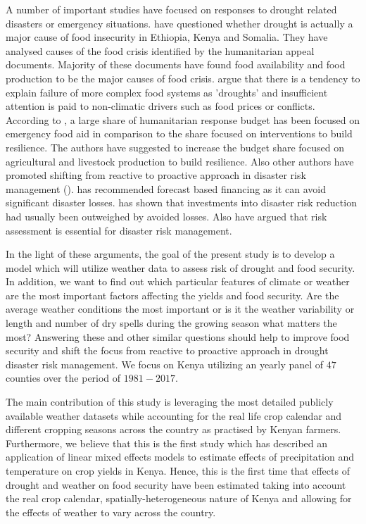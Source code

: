 \documentclass[a4paper,12pt]{article}
\begin{document}
A number of important studies have focused on responses to drought related disasters or emergency situations. \cite{Sandstorm2017} have questioned whether drought is actually a major cause of food insecurity in Ethiopia, Kenya and Somalia. They have analysed causes of the food crisis identified by the humanitarian appeal documents. Majority of these documents have found food availability and food production to be the major causes of food crisis. \cite{Sandstorm2017} argue that there is a tendency to explain failure of more complex food systems as 'droughts' and insufficient attention is paid to non-climatic drivers such as food prices or conflicts. According to \cite{Sandstorm2017}, a large share of humanitarian response budget has been focused on emergency food aid in comparison to the share focused on interventions to build resilience. The authors have suggested to increase the budget share focused on agricultural and livestock production to build resilience. Also other authors have promoted shifting from reactive to proactive approach in disaster risk management (\citealp{Mechler2005,IPCC2012ch1,Nicholson2017}).  \cite{Nicholson2017} has recommended forecast based financing as it can avoid significant disaster losses. \cite{Mechler2005} has shown that investments into disaster risk reduction had usually been outweighed by avoided losses. Also \cite{IPCC2012ch1} have argued that risk assessment is essential for disaster risk management.

In the light of these arguments, the goal of the present study is to develop a model which will utilize weather data to assess risk of drought and food security. In addition, we want to find out which particular features of climate or weather are the most important factors affecting the yields and food security. Are the average weather conditions the most important or is it the weather variability or length and number of dry spells during the growing season what matters the most? Answering these and other similar questions should help to improve food security and shift the focus from reactive to proactive approach in drought disaster risk management. We focus on Kenya utilizing an yearly panel of $47$ counties over the period of $1981-2017$. %


The main contribution of this study is leveraging the most detailed publicly available weather datasets while accounting for the real life crop calendar and different cropping seasons across the country as practised by Kenyan farmers. Furthermore, we believe that this is the first study which has described an application of linear mixed effects models to estimate effects of precipitation and temperature on crop yields in Kenya. Hence, this is the first time that effects of drought and weather on food security have been estimated taking into account the real crop calendar, spatially-heterogeneous nature of Kenya and allowing for the effects of weather to vary across the country.
\end{document}
